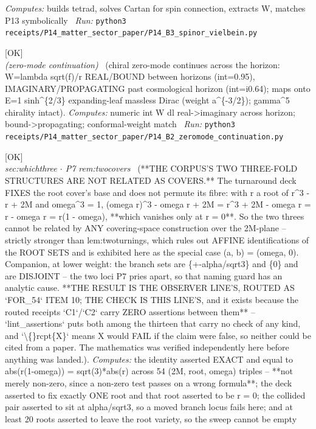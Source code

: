 \begin{description}
\emph{Computes:} builds tetrad, solves Cartan for spin connection, extracts W, matches P13 symbolically
\ \emph{Run:} \texttt{python3 receipts/P14\_matter\_sector\_paper/P14\_B3\_spinor\_vielbein.py}
\item[\label{rcpt:P14_B2_zeromode_continuation}\texttt{P14\_B2\_zeromode\_continuation}]\hfill\textsf{[OK]}\\
\textit{(zero-mode continuation)} \ (chiral zero-mode continues across the horizon: W=lambda sqrt(f)/r REAL/BOUND between horizons (int=0.95), IMAGINARY/PROPAGATING past cosmological horizon (int=i0.64); maps onto E=1 sinh\textasciicircum{}\{2/3\} expanding-leaf massless Dirac (weight a\textasciicircum{}\{-3/2\}); gamma\textasciicircum{}5 chirality intact). 
\emph{Computes:} numeric int W dl real->imaginary across horizon; bound->propagating; conformal-weight match
\ \emph{Run:} \texttt{python3 receipts/P14\_matter\_sector\_paper/P14\_B2\_zeromode\_continuation.py}
\item[\label{rcpt:P14_the_two_threes_are_not_related_as_covers}\texttt{P14\_the\_two\_threes\_are\_not\_related\_as\_covers}]\hfill\textsf{[OK]}\\
\textit{sec:whichthree \ensuremath{\cdot} P7 rem:twocovers} \ (**THE CORPUS'S TWO THREE-FOLD STRUCTURES ARE NOT RELATED AS COVERS.** The turnaround deck FIXES the root cover's base and does not permute its fibre: with r a root of r\textasciicircum{}3 - r + 2M and omega\textasciicircum{}3 = 1, (omega r)\textasciicircum{}3 - omega r + 2M = r\textasciicircum{}3 + 2M - omega r = r - omega r = r(1 - omega), **which vanishes only at r = 0**. So the two threes cannot be related by ANY covering-space construction over the 2M-plane -- strictly stronger than lem:twoturnings, which rules out AFFINE identifications of the ROOT SETS and is exhibited here as the special case (a, b) = (omega, 0). Companion, at lower weight: the branch sets are \{+-alpha/sqrt3\} and \{0\} and are DISJOINT -- the two loci P7 pries apart, so that naming guard has an analytic cause. **THE RESULT IS THE OBSERVER LINE'S, ROUTED AS `FOR\_54` ITEM 10; THE CHECK IS THIS LINE'S, and it exists because the routed receipts `C1`/`C2` carry ZERO assertions between them** -- `lint\_assertions` puts both among the thirteen that carry no check of any kind, and `\textbackslash\{\}rcpt\{X\}` means X would FAIL if the claim were false, so neither could be cited from a paper. The mathematics was verified independently here before anything was landed.). 
\emph{Computes:} the identity asserted EXACT and equal to abs(r(1-omega)) = sqrt(3)*abs(r) across 54 (2M, root, omega) triples -- **not merely non-zero, since a non-zero test passes on a wrong formula**; the deck asserted to fix exactly ONE root and that root asserted to be r = 0; the collided pair asserted to sit at alpha/sqrt3, so a moved branch locus fails here; and at least 20 roots asserted to leave the root variety, so the sweep cannot be empty

\end{description}
